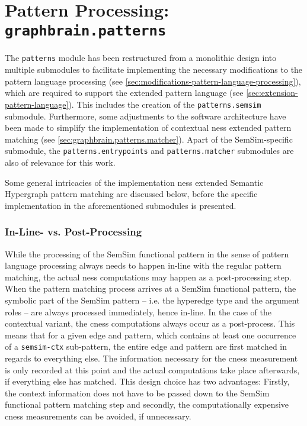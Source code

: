 \documentclass[11pt]{scrreprt}
\begin{document}
\section{Pattern Processing: \texttt{graphbrain.patterns}}
The \texttt{patterns} module has been restructured from a monolithic design into multiple submodules to facilitate implementing the necessary modifications to the pattern language processing (see \cref{sec:modifications-pattern-language-processing}), which are required to support the extended pattern language (see \cref{sec:extension-pattern-language}). This includes the creation of the \texttt{patterns.semsim} submodule. Furthermore, some adjustments to the software architecture have been made to simplify the implementation of contextual \gls{ness} extended pattern matching (see \cref{sec:graphbrain.patterns.matcher}). Apart of the SemSim-specific submodule, the \texttt{patterns.entrypoints} and \texttt{patterns.matcher} submodules are also of relevance for this work.

Some general intricacies of the implementation \gls{ness} extended Semantic Hypergraph pattern matching are discussed below, before the specific implementation in the aforementioned submodules is presented.


\subsubsection{In-Line- vs. Post-Processing}
While the processing of the SemSim functional pattern in the sense of pattern language processing always needs to happen in-line with the regular pattern matching, the actual \gls{ness} computations may happen as a post-processing step. When the pattern matching process arrives at a SemSim functional pattern, the symbolic part of the SemSim pattern -- i.e. the hyperedge type and the argument roles -- are always processed immediately, hence in-line. In the case of the contextual variant, the \gls{cness} computations always occur as a post-process. This means that for a given edge and pattern, which contains at least one occurrence of a \texttt{semsim-ctx} sub-pattern, the entire edge and pattern are first matched in regards to everything else. The information necessary for the \gls{cness} measurement is only recorded at this point and the actual computations take place afterwards, if everything else has matched. This design choice has two advantages: Firstly, the context information does not have to be passed down to the SemSim functional pattern matching step and secondly, the computationally expensive \gls{cness} measurements can be avoided, if unnecessary.
\end{document}
